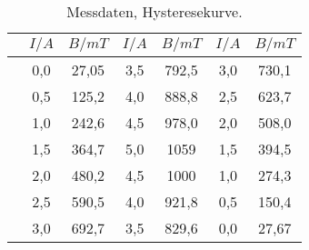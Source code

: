 \begin{table}
        \caption{Messdaten, Hysteresekurve.}
        \centering
        \label{de}
        \begin{tabular}{l@{}cc|cc|cc} \toprule & {$I/\si{A}$}& {$B/\si{mT}$}& {$I/\si{A}$}& {$B/\si{mT}$}& {$I/\si{A}$}& {$B/\si{mT}$}\\\midrule& 0,0 & 27,05 & 3,5 & 792,5 & 3,0 & 730,1 \\
& 0,5 & 125,2 & 4,0 & 888,8 & 2,5 & 623,7 \\
& 1,0 & 242,6 & 4,5 & 978,0 & 2,0 & 508,0 \\
& 1,5 & 364,7 & 5,0 & 1059 & 1,5 & 394,5 \\
& 2,0 & 480,2 & 4,5 & 1000 & 1,0 & 274,3 \\
& 2,5 & 590,5 & 4,0 & 921,8 & 0,5 & 150,4 \\
& 3,0 & 692,7 & 3,5 & 829,6 & 0,0 & 27,67 \\
 \bottomrule \end{tabular} \end{table}
